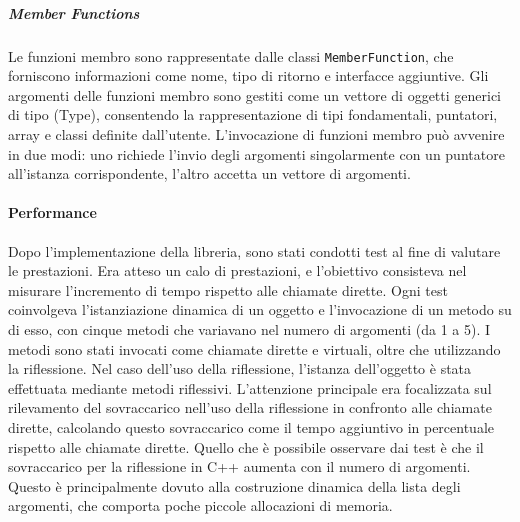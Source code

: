 \documentclass[11pt]{article}
\begin{document}
\begin{multicols*}{2}[\columnsep=1cm]
    \subparagraph*{Member Functions}
    Le funzioni membro sono rappresentate dalle classi \texttt{MemberFunction}, che forniscono informazioni come nome, tipo di ritorno e interfacce aggiuntive.
    Gli argomenti delle funzioni membro sono gestiti come un vettore di oggetti generici di tipo (Type), consentendo la rappresentazione di tipi fondamentali, puntatori, array e classi definite dall'utente.
    L'invocazione di funzioni membro può avvenire in due modi: uno richiede l'invio degli argomenti singolarmente con un puntatore all'istanza corrispondente, l'altro accetta un vettore di argomenti.

    \paragraph{Performance}
    Dopo l'implementazione della libreria, sono stati condotti test al fine di valutare le prestazioni. Era atteso un calo di prestazioni, e l'obiettivo consisteva nel misurare l'incremento di tempo rispetto alle chiamate dirette. Ogni test coinvolgeva l'istanziazione dinamica di un oggetto e l'invocazione di un metodo su di esso, con cinque metodi che variavano nel numero di argomenti (da 1 a 5). I metodi sono stati invocati come chiamate dirette e virtuali, oltre che utilizzando la riflessione. Nel caso dell'uso della riflessione, l'istanza dell'oggetto è stata effettuata mediante metodi riflessivi. L'attenzione principale era focalizzata sul rilevamento del sovraccarico nell'uso della riflessione in confronto alle chiamate dirette, calcolando questo sovraccarico come il tempo aggiuntivo in percentuale rispetto alle chiamate dirette.
    Quello che è possibile osservare dai test è che il sovraccarico per la riflessione in C++ aumenta con il numero di argomenti. Questo è principalmente dovuto alla costruzione dinamica della lista degli argomenti, che comporta poche piccole allocazioni di memoria. 

\end{multicols*}
\end{document}
